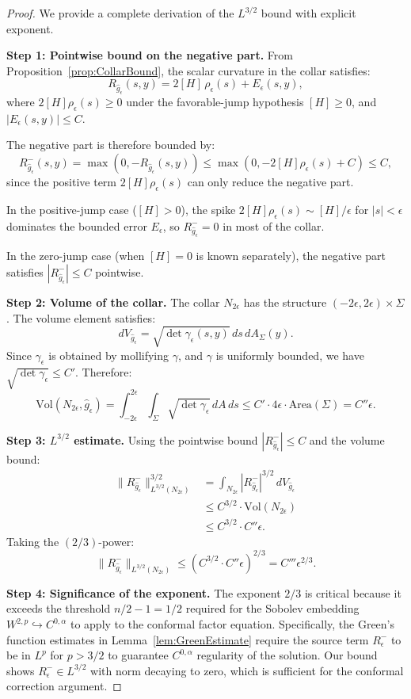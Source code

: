 \begin{proof}
We provide a complete derivation of the $L^{3/2}$ bound with explicit exponent.

\textbf{Step 1: Pointwise bound on the negative part.}
From Proposition~\ref{prop:CollarBound}, the scalar curvature in the collar satisfies:
\[
    R_{\hat{g}_\epsilon}(s,y) = 2[H] \, \rho_\epsilon(s) + E_\epsilon(s,y),
\]
where $2[H] \rho_\epsilon(s) \ge 0$ under the favorable-jump hypothesis $[H] \ge 0$, and $|E_\epsilon(s,y)| \le C$.

The negative part is therefore bounded by:
\[
    R_{\hat{g}_\epsilon}^-(s,y) = \max(0, -R_{\hat{g}_\epsilon}(s,y)) \le \max(0, -2[H]\rho_\epsilon(s) + C) \le C,
\]
since the positive term $2[H]\rho_\epsilon(s)$ can only reduce the negative part.

In the positive-jump case ($[H] > 0$), the spike $2[H]\rho_\epsilon(s) \sim [H]/\epsilon$ for $|s| < \epsilon$ dominates the bounded error $E_\epsilon$, so $R_{\hat{g}_\epsilon}^- = 0$ in most of the collar.

In the zero-jump case (when $[H] = 0$ is known separately), the negative part satisfies $|R_{\hat{g}_\epsilon}^-| \le C$ pointwise.

\textbf{Step 2: Volume of the collar.}
The collar $N_{2\epsilon}$ has the structure $(-2\epsilon, 2\epsilon) \times \Sigma$. The volume element satisfies:
\[
    dV_{\hat{g}_\epsilon} = \sqrt{\det \gamma_\epsilon(s,y)} \, ds \, dA_{\Sigma}(y).
\]
Since $\gamma_\epsilon$ is obtained by mollifying $\gamma$, and $\gamma$ is uniformly bounded, we have $\sqrt{\det \gamma_\epsilon} \le C'$. Therefore:
\[
    \text{Vol}(N_{2\epsilon}, \hat{g}_\epsilon) = \int_{-2\epsilon}^{2\epsilon} \int_\Sigma \sqrt{\det \gamma_\epsilon} \, dA \, ds \le C' \cdot 4\epsilon \cdot \text{Area}(\Sigma) = C'' \epsilon.
\]

\textbf{Step 3: $L^{3/2}$ estimate.}
Using the pointwise bound $|R_{\hat{g}_\epsilon}^-| \le C$ and the volume bound:
\begin{align}
    \|R_{\hat{g}_\epsilon}^-\|_{L^{3/2}(N_{2\epsilon})}^{3/2} &= \int_{N_{2\epsilon}} |R_{\hat{g}_\epsilon}^-|^{3/2} \, dV_{\hat{g}_\epsilon} \\
    &\le C^{3/2} \cdot \text{Vol}(N_{2\epsilon}) \\
    &\le C^{3/2} \cdot C'' \epsilon.
\end{align}
Taking the $(2/3)$-power:
\[
    \|R_{\hat{g}_\epsilon}^-\|_{L^{3/2}(N_{2\epsilon})} \le (C^{3/2} \cdot C'' \epsilon)^{2/3} = C''' \epsilon^{2/3}.
\]

\textbf{Step 4: Significance of the exponent.}
The exponent $2/3$ is critical because it exceeds the threshold $n/2 - 1 = 1/2$ required for the Sobolev embedding $W^{2,p} \hookrightarrow C^{0,\alpha}$ to apply to the conformal factor equation. Specifically, the Green's function estimates in Lemma~\ref{lem:GreenEstimate} require the source term $R^-_\epsilon$ to be in $L^p$ for $p > 3/2$ to guarantee $C^{0,\alpha}$ regularity of the solution. Our bound shows $R^-_\epsilon \in L^{3/2}$ with norm decaying to zero, which is sufficient for the conformal correction argument.
\end{proof}

